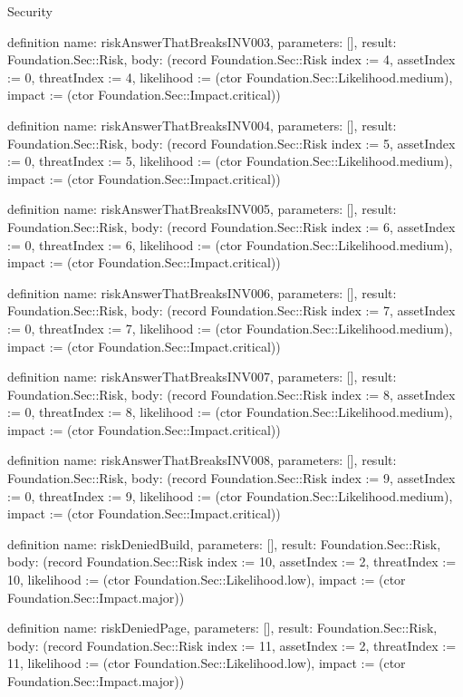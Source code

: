 \begin{lexlean}{Security}
\begin{semanticmodule}
definition{
  name: riskAnswerThatBreaksINV003,
  parameters: [],
  result: Foundation.Sec::Risk,
  body: (record Foundation.Sec::Risk {index := 4, assetIndex := 0, threatIndex := 4, likelihood := (ctor Foundation.Sec::Likelihood.medium), impact := (ctor Foundation.Sec::Impact.critical)})
}

definition{
  name: riskAnswerThatBreaksINV004,
  parameters: [],
  result: Foundation.Sec::Risk,
  body: (record Foundation.Sec::Risk {index := 5, assetIndex := 0, threatIndex := 5, likelihood := (ctor Foundation.Sec::Likelihood.medium), impact := (ctor Foundation.Sec::Impact.critical)})
}

definition{
  name: riskAnswerThatBreaksINV005,
  parameters: [],
  result: Foundation.Sec::Risk,
  body: (record Foundation.Sec::Risk {index := 6, assetIndex := 0, threatIndex := 6, likelihood := (ctor Foundation.Sec::Likelihood.medium), impact := (ctor Foundation.Sec::Impact.critical)})
}

definition{
  name: riskAnswerThatBreaksINV006,
  parameters: [],
  result: Foundation.Sec::Risk,
  body: (record Foundation.Sec::Risk {index := 7, assetIndex := 0, threatIndex := 7, likelihood := (ctor Foundation.Sec::Likelihood.medium), impact := (ctor Foundation.Sec::Impact.critical)})
}

definition{
  name: riskAnswerThatBreaksINV007,
  parameters: [],
  result: Foundation.Sec::Risk,
  body: (record Foundation.Sec::Risk {index := 8, assetIndex := 0, threatIndex := 8, likelihood := (ctor Foundation.Sec::Likelihood.medium), impact := (ctor Foundation.Sec::Impact.critical)})
}

definition{
  name: riskAnswerThatBreaksINV008,
  parameters: [],
  result: Foundation.Sec::Risk,
  body: (record Foundation.Sec::Risk {index := 9, assetIndex := 0, threatIndex := 9, likelihood := (ctor Foundation.Sec::Likelihood.medium), impact := (ctor Foundation.Sec::Impact.critical)})
}

definition{
  name: riskDeniedBuild,
  parameters: [],
  result: Foundation.Sec::Risk,
  body: (record Foundation.Sec::Risk {index := 10, assetIndex := 2, threatIndex := 10, likelihood := (ctor Foundation.Sec::Likelihood.low), impact := (ctor Foundation.Sec::Impact.major)})
}

definition{
  name: riskDeniedPage,
  parameters: [],
  result: Foundation.Sec::Risk,
  body: (record Foundation.Sec::Risk {index := 11, assetIndex := 2, threatIndex := 11, likelihood := (ctor Foundation.Sec::Likelihood.low), impact := (ctor Foundation.Sec::Impact.major)})
}


\end{semanticmodule}
\end{lexlean}

